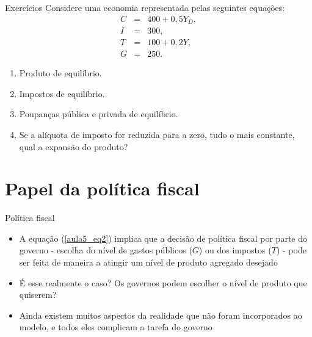 \documentclass[10pt]{beamer}
\begin{document}
\begin{frame}{Exercícios}
    Considere uma economia representada pelas seguintes equações:
    \begin{eqnarray}
        C &=& 400 + 0,5Y_D, \nonumber \\
        I &=& 300, \nonumber \\
        T &=& 100 + 0,2Y, \nonumber \\
        G &=& 250. \nonumber
    \end{eqnarray}
    \begin{enumerate}
        \item Produto de equilíbrio.

        \item Impostos de equilíbrio.

        \item Poupanças pública e privada de equilíbrio.

        \item Se a alíquota de imposto for reduzida para a zero, tudo o mais constante, qual a expansão do produto?
    \end{enumerate}
\end{frame}

\section{Papel da política fiscal}
\begin{frame}{Política fiscal}
    \begin{itemize}
        \item A equação (\ref{aula5_eq2}) implica que a decisão de política fiscal por parte do governo - escolha do nível de gastos públicos ($G$) ou dos impostos ($T$) - pode ser feita de maneira a atingir um nível de produto agregado desejado\bigskip

        \item É esse realmente o caso? Os governos podem escolher o nível de produto que quiserem?\bigskip

        \item Ainda existem muitos aspectos da realidade que não foram incorporados ao modelo, e todos eles complicam a tarefa do governo
    \end{itemize}
\end{frame}
\end{document}
